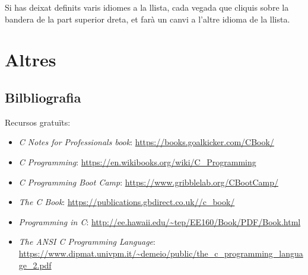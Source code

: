\documentclass[]{book}
\providecommand{\tightlist}{%
  \setlength{\itemsep}{0pt}\setlength{\parskip}{0pt}}
\begin{document}
Si has deixat definits varis idiomes a la llista, cada vegada que
cliquis sobre la bandera de la part superior dreta, et farà un canvi a
l'altre idioma de la llista.

\chapter{Altres}\label{altres}

\section{Bilbliografia}\label{bilbliografia}

Recursos gratuïts:

\begin{itemize}
\tightlist
\item
  \emph{C Notes for Professionals book}:
  \url{https://books.goalkicker.com/CBook/}
\item
  \emph{C Programming}:
  \url{https://en.wikibooks.org/wiki/C_Programming}
\item
  \emph{C Programming Boot Camp}:
  \url{https://www.gribblelab.org/CBootCamp/}
\item
  \emph{The C Book}: \url{https://publications.gbdirect.co.uk//c_book/}
\item
  \emph{Programming in C}:
  \url{http://ee.hawaii.edu/~tep/EE160/Book/PDF/Book.html}
\item
  \emph{The ANSI C Programming Language}:
  \url{https://www.dipmat.univpm.it/~demeio/public/the_c_programming_language_2.pdf}
\end{itemize}


\end{document}
